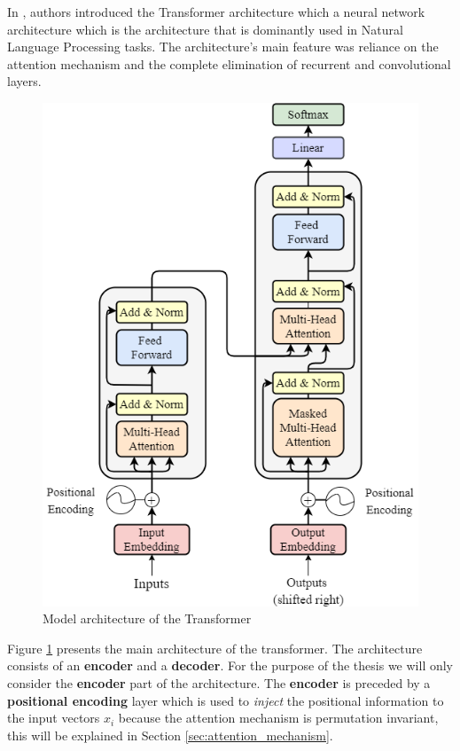 \documentclass[a4paper, twoside]{report}
\theoremstyle{definition}
\numberwithin{equation}{section}
\begin{document}
In \cite{1706.03762}, authors introduced the Transformer architecture which a neural network architecture
which is the architecture that is dominantly used in Natural Language Processing tasks.
The architecture's main feature was reliance on the attention mechanism and the complete elimination
of recurrent and convolutional layers.

\begin{figure}[h!]
    \centering
    \includegraphics[scale=0.5]{attention_is_all_you_need.png}
    \caption{Model architecture of the Transformer \cite{1706.03762}}
    \label{fig:attention_is_all_you_need}
\end{figure}

Figure \ref{fig:attention_is_all_you_need} presents the main architecture of the transformer.
The architecture consists of an \textbf{encoder} and a \textbf{decoder}.
For the purpose of the thesis we will only consider the \textbf{encoder} part of the architecture.
The \textbf{encoder} is preceded by a \textbf{positional encoding} layer which is used to \emph{inject} the positional information
to the input vectors $x_i$ because the attention mechanism is permutation invariant, this will be explained in Section \ref{sec:attention_mechanism}.
\end{document}

